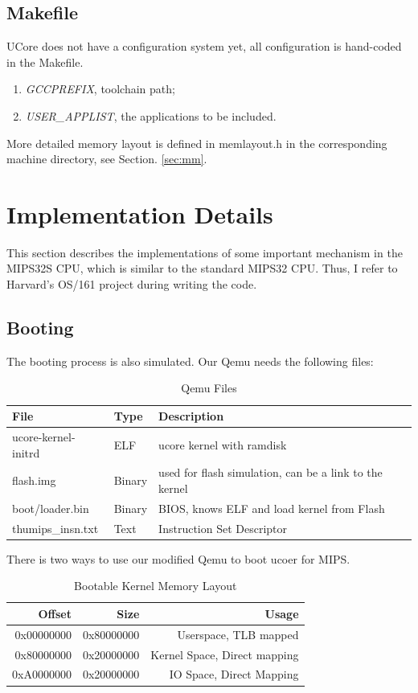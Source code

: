 \documentclass[a4paper]{article}
\begin{document}
\subsection{Makefile}
UCore does not have a configuration system yet, all configuration
is hand-coded in the Makefile.
\begin{enumerate}
\item \emph{GCCPREFIX}, toolchain path;
\item \emph{USER\_APPLIST}, the applications to be included.
\end{enumerate}

More detailed memory layout is defined in memlayout.h in the corresponding
machine directory, see Section. \ref{sec:mm}.

\section{Implementation Details}
This section describes the implementations of some important mechanism 
in the MIPS32S CPU, which is similar to the standard MIPS32 CPU.
Thus, I refer to Harvard's OS/161\cite{OS161} project during writing the code.

\subsection{Booting}
The booting process is also simulated. Our Qemu needs the following files:

\begin{table}[h]
\centering
\begin{tabular}{|l|l|l|}
\hline
 File & Type & Description \\
\hline
ucore-kernel-initrd & ELF & ucore kernel with ramdisk\\
flash.img & Binary & used for flash simulation, can be a link to the kernel\\
boot/loader.bin & Binary & BIOS, knows ELF and load kernel from Flash\\
thumips\_insn.txt & Text & Instruction Set Descriptor\\
\hline
\end{tabular}
\caption{Qemu Files}
\label{tab:qemufile}
\end{table}


There is two ways to use our modified Qemu
to boot ucoer for MIPS. 

\begin{table}[h]
  \centering
  \begin{tabular}{|r|r|r|}
    \hline
    Offset & Size & Usage\\
    \hline
    0x00000000 & 0x80000000 & Userspace, TLB mapped\\
    0x80000000 & 0x20000000 & Kernel Space, Direct mapping \\
    0xA0000000 & 0x20000000 & IO Space, Direct Mapping \\
    \hline
  \end{tabular}
  \caption{Bootable Kernel Memory Layout}
  \label{tab:layout}
\end{table}
\end{document}
